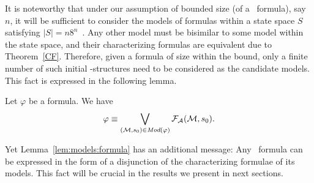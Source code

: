 \documentclass{article}
\begin{document}
It is noteworthy that under our assumption of bounded size (of a \CTL\ formula), say $n$, it will be sufficient to consider the models of formulas within a state space $S$ satisfying $|S|=n8^n$~\cite{DBLP:journals/jcss/EmersonH85}.
Any other model must be bisimilar to some model within the state space, and their characterizing formulas are equivalent due to Theorem~\ref{CF}. Therefore, given a formula of size within the bound, only a finite number of such initial \MPK-structures need to be considered as the candidate models. This fact is expressed in the following lemma.
\begin{lemma}\label{lem:models:formula}
  Let $\varphi$ be a formula. We have
  \begin{equation}
    \varphi\equiv \bigvee_{({\cal M}, s_0)\in\textit{Mod}(\varphi)}{\cal F}_{\cal A}({\cal M}, s_0).
\end{equation}
\end{lemma}
Yet Lemma~\ref{lem:models:formula} has an additional message: Any \CTL\ formula  can be expressed in the form of a disjunction of the characterizing formulae of its models. This fact will be  crucial  in the results we present in next sections.
\end{document}
